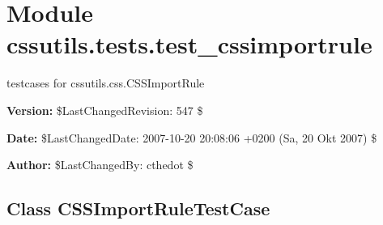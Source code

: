 %
%
%


\section{Module cssutils.tests.test\_cssimportrule}

    \label{cssutils:tests:test_cssimportrule}
testcases for cssutils.css.CSSImportRule

\textbf{Version:} \$LastChangedRevision: 547 \$



\textbf{Date:} \$LastChangedDate: 2007-10-20 20:08:06 +0200 (Sa, 20 Okt 2007) \$



\textbf{Author:} \$LastChangedBy: cthedot \$





\subsection{Class CSSImportRuleTestCase}

